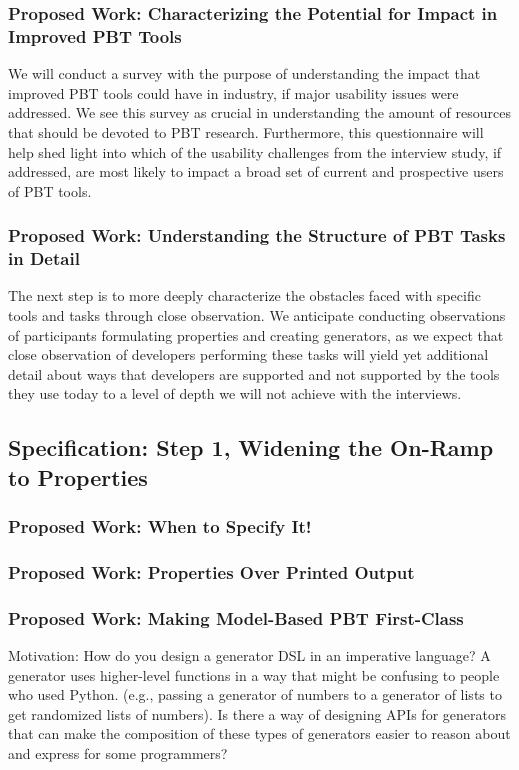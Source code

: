 \subsubsection{Proposed Work: Characterizing the Potential for Impact in Improved PBT Tools}

We will conduct a survey with the purpose of understanding the impact that
improved PBT tools could have in industry, if major usability issues were
addressed. We see this survey as crucial in understanding the amount of
resources that should be devoted to PBT research. Furthermore, this
questionnaire will help shed light into which of the usability challenges from
the interview study, if addressed, are most likely to impact a broad set of
current and prospective users of PBT tools.

\subsubsection{Proposed Work: Understanding the Structure of PBT Tasks in Detail}

The next step is to more deeply characterize the obstacles faced with specific
tools and tasks through close observation. We anticipate conducting observations
of participants formulating properties and creating generators, as we expect
that close observation of developers performing these tasks will yield yet
additional detail about ways that developers are supported and not supported by
the tools they use today to a level of depth we will not achieve with the
interviews.

\subsection{Specification: Step 1, Widening the On-Ramp to Properties }
\subsubsection{Proposed Work: When to Specify It!}
\subsubsection{Proposed Work: Properties Over Printed Output}
\subsubsection{Proposed Work: Making Model-Based PBT First-Class}

Motivation: How do you design a generator DSL in an imperative language? A
generator uses higher-level functions in a way that might be confusing to people
who used Python.  (e.g., passing a generator of numbers to a generator of lists
to get randomized lists of numbers). Is there a way of designing APIs for
generators that can make the composition of these types of generators easier to
reason about and express for some programmers?

